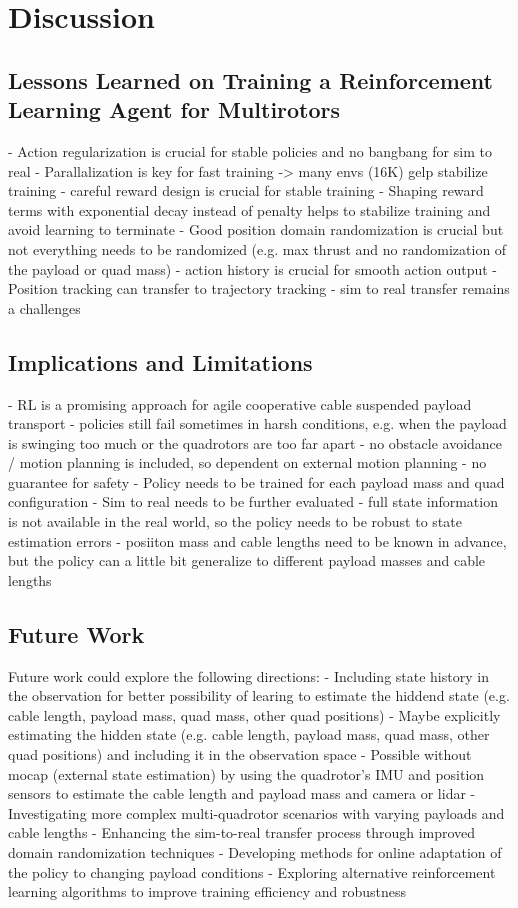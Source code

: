 \chapter{Discussion}
\section{Lessons Learned on Training a Reinforcement Learning Agent for Multirotors}
- Action regularization is crucial for stable policies and no bangbang for sim to real
- Parallalization is key for fast training -> many envs (16K)  gelp stabilize training
- careful reward design is crucial for stable training 
- Shaping reward terms with exponential decay instead of penalty helps to stabilize training and avoid learning to terminate
- Good position domain randomization is crucial but not everything needs to be randomized (e.g. max thrust and no randomization of the payload  or quad mass)
- action history is crucial for smooth action output
- Position tracking can transfer to trajectory tracking
- sim to real transfer remains a challenges

\section{Implications and Limitations}
- RL is a promising approach for agile cooperative cable suspended payload transport
- policies still fail sometimes in harsh conditions, e.g. when the payload is swinging too much or the quadrotors are too far apart
- no obstacle avoidance / motion planning is included, so dependent on external motion planning
- no guarantee for safety
- Policy needs to be trained for each payload mass and quad configuration
- Sim to real needs to be further evaluated
- full state information is not available in the real world, so the policy needs to be robust to state estimation errors
- posiiton mass and cable lengths need to be known in advance, but the policy can a little bit generalize to different payload masses and cable lengths

\section{Future Work}
Future work could explore the following directions:
- Including state history in the observation for better possibility of learing to estimate the hiddend state (e.g. cable length, payload mass, quad mass, other quad positions)
- Maybe explicitly estimating the hidden state (e.g. cable length, payload mass, quad mass, other quad positions) and including it in the observation space
- Possible without mocap (external state estimation) by using the quadrotor's IMU and position sensors to estimate the cable length and payload mass and camera or lidar
- Investigating more complex multi-quadrotor scenarios with varying payloads and cable lengths
- Enhancing the sim-to-real transfer process through improved domain randomization techniques
- Developing methods for online adaptation of the policy to changing payload conditions
- Exploring alternative reinforcement learning algorithms to improve training efficiency and robustness